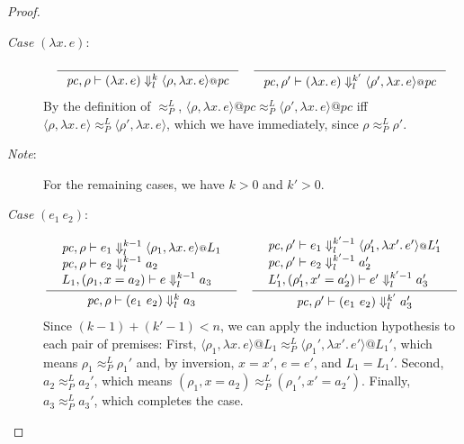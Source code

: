 \documentclass{article}
\makeatletter
\theoremstyle{definition}
\newcommand{\at}{\ensuremath{{\scriptstyle{@}}}}
\newcommand{\pc}{\ensuremath{{\mathit{pc}}}}
\makeatother
\begin{document}
\begin{proof}
\begin{description}
  \item[\emph{Case} $(\lambda{x}.\, e)$:]
    \begin{gather*}
      \inference{}{
        \pc, \rho |- (\lambda{x}.\, e) \Downarrow^{k}_{l}
        \langle{\rho, \lambda{x}.\, e\rangle} \at \pc
      }
      \quad
      \inference{}{
        \pc, \rho' |- (\lambda{x}.\, e) \Downarrow^{k'}_{l}
        \langle{\rho', \lambda{x}.\, e\rangle} \at \pc
      }
    \end{gather*}
    By the definition of $\approx^{L}_{P}$,
    $\langle{\rho, \lambda{x}.\, e\rangle} \at \pc
    \approx^{L}_{P}
    \langle{\rho', \lambda{x}.\, e\rangle} \at \pc$
    iff
    $\langle{\rho, \lambda{x}.\, e\rangle}
    \approx^{L}_{P}
    \langle{\rho', \lambda{x}.\, e\rangle}$,
    which we have immediately, since $\rho \approx^{L}_{P} \rho'$.

  \item[\emph{Note}:]
    For the remaining cases, we have $k > 0$ and $k' > 0$.
    
  \item[\emph{Case} $(e_1\ e_2)$:]
    \begin{gather*}
      \inference{
        {\begin{array}{l}
            \pc, \rho |- e_1 \Downarrow^{k-1}_{l}
            \langle{\rho_1, \lambda{x}.\, e\rangle} \at L_1
            \\
            \pc, \rho |- e_2 \Downarrow^{k-1}_{l} a_2
            \\
            L_1, (\rho_1, x = a_2) |- e \Downarrow^{k-1}_{l} a_3
          \end{array}}
      }{
        \pc, \rho |- (e_1\ e_2) \Downarrow^{k}_{l} a_3
      }
      \quad
      \inference{
        {\begin{array}{l}
            \pc, \rho' |- e_1 \Downarrow^{k'-1}_{l}
            \langle{\rho_1', \lambda{x'}.\, e'\rangle} \at L_1'
            \\
            \pc, \rho' |- e_2 \Downarrow^{k'-1}_{l} a_2'
            \\
            L_1', (\rho_1', x' = a_2') |- e' \Downarrow^{k'-1}_{l} a_3'
          \end{array}}
      }{
        \pc, \rho' |- (e_1\ e_2) \Downarrow^{k'}_{l} a_3'
      }
    \end{gather*}
    Since $(k-1) + (k'-1) < n$, we can apply the induction hypothesis
    to each pair of premises:
    First,
    $\langle{\rho_1, \lambda{x}.\, e\rangle} \at L_1
    \approx^{L}_{P}
    \langle{\rho_1', \lambda{x'}.\, e'\rangle} \at L_1'$,
    which means $\rho_1 \approx^{L}_{P} \rho_1'$ and, by inversion,
    $x = x'$, $e = e'$, and $L_1 = L_1'$.
    Second,
    $a_2 \approx^{L}_{P} a_2'$,
    which means
    $(\rho_1, x = a_2) \approx^{L}_{P} (\rho_1', x' = a_2')$.
    Finally,
    $a_3 \approx^{L}_{P} a_3'$,
    which completes the case.
    

\end{description}
\end{proof}
\end{document}
